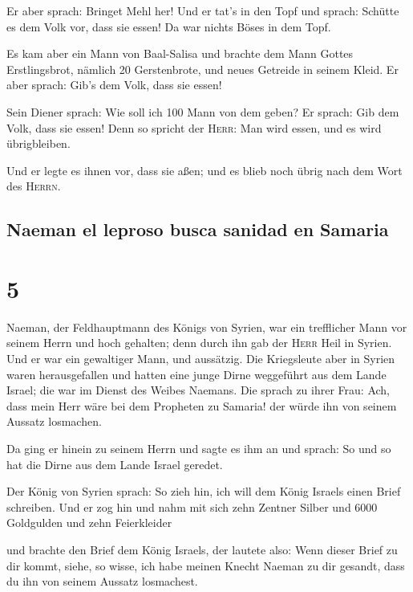  Er aber sprach: Bringet Mehl her! Und er tat's in den
Topf und sprach: Schütte es dem Volk vor, dass sie essen! Da war nichts
Böses in dem Topf.

 Es kam aber ein Mann von Baal-Salisa und brachte dem
Mann Gottes Erstlingsbrot, nämlich 20 Gerstenbrote, und neues Getreide
in seinem Kleid. Er aber sprach: Gib's dem Volk, dass sie essen!

 Sein Diener sprach: Wie soll ich 100 Mann von dem geben?
Er sprach: Gib dem Volk, dass sie essen! Denn so spricht der
\textsc{Herr}: Man wird essen, und es wird übrigbleiben.

 Und er legte es ihnen vor, dass sie aßen; und es blieb
noch übrig nach dem Wort des \textsc{Herrn}.

\hypertarget{naeman-el-leproso-busca-sanidad-en-samaria}{%
\subsection{Naeman el leproso busca sanidad en
Samaria}\label{naeman-el-leproso-busca-sanidad-en-samaria}}

\hypertarget{section-4}{%
\section{5}\label{section-4}}

 Naeman, der Feldhauptmann des Königs von Syrien, war ein
trefflicher Mann vor seinem Herrn und hoch gehalten; denn durch ihn gab
der \textsc{Herr} Heil in Syrien. Und er war ein gewaltiger Mann, und
aussätzig.  Die Kriegsleute aber in Syrien waren
herausgefallen und hatten eine junge Dirne weggeführt aus dem Lande
Israel; die war im Dienst des Weibes Naemans.  Die sprach
zu ihrer Frau: Ach, dass mein Herr wäre bei dem Propheten zu Samaria!
der würde ihn von seinem Aussatz losmachen.

 Da ging er hinein zu seinem Herrn und sagte es ihm an und
sprach: So und so hat die Dirne aus dem Lande Israel geredet.

 Der König von Syrien sprach: So zieh hin, ich will dem
König Israels einen Brief schreiben. Und er zog hin und nahm mit sich
zehn Zentner Silber und 6000 Goldgulden und zehn Feierkleider

 und brachte den Brief dem König Israels, der lautete
also: Wenn dieser Brief zu dir kommt, siehe, so wisse, ich habe meinen
Knecht Naeman zu dir gesandt, dass du ihn von seinem Aussatz losmachest.

